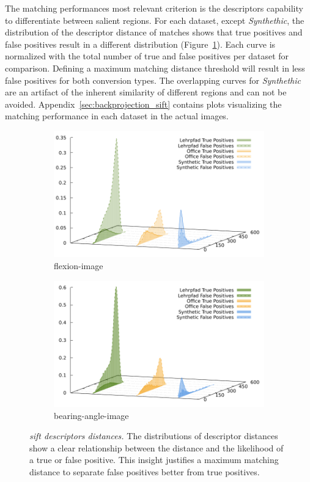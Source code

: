 The matching performances most relevant criterion is the descriptors capability to differentiate between salient regions.
For each dataset, except \emph{Synthethic}, the distribution of the descriptor distance of matches shows that true positives and false positives result in a different distribution (Figure~\ref{fig:sift_descriptor_distance}).
Each curve is normalized with the total number of true and false positives per dataset for comparison.
Defining a maximum matching distance threshold will result in less false positives for both conversion types.
The overlapping curves for \emph{Synthethic} are an artifact of the inherent similarity of different regions and can not be avoided.
Appendix~\ref{sec:backprojection_sift} contains plots visualizing the matching performance in each dataset in the actual images.
\begin{figure}[H]
\begin{subfigure}[t]{0.45\linewidth}
    \includegraphics[width=\linewidth]{chapter06/results/SIFT/flexion/descriptor_distances.pdf}%
    \caption{\gls{flexion-image}}
\end{subfigure}\quad
\begin{subfigure}[t]{0.45\linewidth}
    \includegraphics[width=\linewidth]{chapter06/results/SIFT/bearing/descriptor_distances.pdf}%
    \caption{\gls{bearing-angle-image}}
\end{subfigure}
\caption[\acrshort{sift} descriptors distances]{\emph{\acrshort{sift} descriptors distances.} The distributions of descriptor distances show a clear relationship between the distance and the likelihood of a true or false positive. This insight justifies a maximum matching distance to separate false positives better from true positives.}\label{fig:sift_descriptor_distance}
\end{figure}
